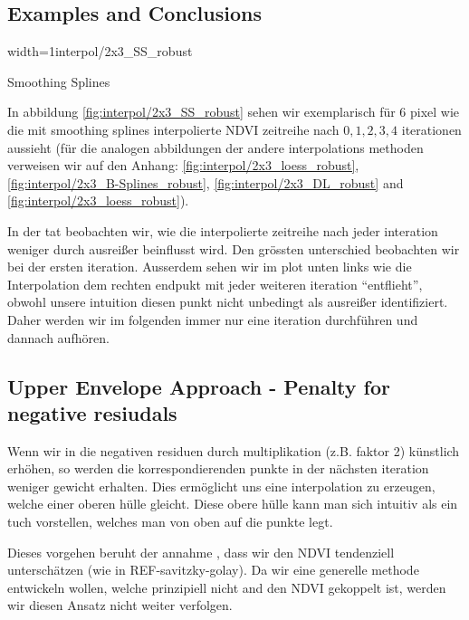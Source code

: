 {	\subsection{Examples and Conclusions}{
		\begin{my_figure}[h]{width=1\textwidth}{interpol/2x3_SS_robust}
			\caption{Smoothing Splines \RobItPlot}
			\label{fig:interpol/2x3_SS_robust}
		\end{my_figure}

		In abbildung \ref{fig:interpol/2x3_SS_robust} sehen wir exemplarisch für 6 pixel wie die mit smoothing splines interpolierte NDVI zeitreihe nach $0,1,2,3,4$ iterationen aussieht (für die analogen abbildungen der andere interpolations methoden verweisen wir auf den Anhang: \ref{fig:interpol/2x3_loess_robust}, \ref{fig:interpol/2x3_B-Splines_robust}, \ref{fig:interpol/2x3_DL_robust} and \ref{fig:interpol/2x3_loess_robust}).
		
		In der tat beobachten wir, wie die interpolierte zeitreihe nach jeder interation weniger durch ausreißer beinflusst wird. Den grössten unterschied beobachten wir bei der ersten iteration. Ausserdem sehen wir im plot unten links wie die Interpolation dem rechten endpukt mit jeder weiteren iteration ``entflieht'', obwohl unsere intuition diesen punkt nicht unbedingt als ausreißer identifiziert. Daher werden wir im folgenden immer nur eine iteration durchführen und dannach aufhören.
 
	} 
	
	\subsection{Upper Envelope Approach - Penalty for negative resiudals}
		Wenn wir in  die negativen residuen durch multiplikation (z.B. faktor 2) künstlich erhöhen, so werden die korrespondierenden punkte in der nächsten iteration weniger gewicht erhalten. Dies ermöglicht uns eine interpolation zu erzeugen, welche einer oberen hülle gleicht. Diese obere hülle kann man sich intuitiv als ein tuch vorstellen, welches man von oben auf die punkte legt.
		
		Dieses vorgehen beruht der annahme , dass wir den NDVI tendenziell unterschätzen (wie in REF-savitzky-golay). Da wir eine generelle methode entwickeln wollen, welche prinzipiell nicht and den NDVI gekoppelt ist, werden wir diesen Ansatz nicht weiter verfolgen.

}
